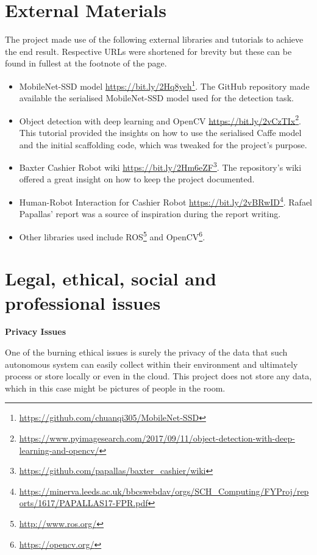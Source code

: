 \begin{appendices}
\chapter{External Materials}

The project made use of the following external libraries and tutorials to achieve the end result. Respective URLs were shortened for brevity but these can be found in fullest at the footnote of the page.

\begin{itemize}
  \item MobileNet-SSD model \url{https://bit.ly/2Hq8yeh}\footnote{\url{https://github.com/chuanqi305/MobileNet-SSD}}. The GitHub repository made available the serialised MobileNet-SSD model used for the detection task. 
  \item Object detection with deep learning and OpenCV \url{https://bit.ly/2vCzTIx}\footnote{\url{https://www.pyimagesearch.com/2017/09/11/object-detection-with-deep-learning-and-opencv/}}. This tutorial provided the insights on how to use the serialised Caffe model and the initial scaffolding code, which was tweaked for the project's purpose.
  \item Baxter Cashier Robot wiki \url{https://bit.ly/2Hm6eZF}\footnote{\url{https://github.com/papallas/baxter_cashier/wiki}}. The repository's wiki offered a great insight on how to keep the project documented.
  \item Human-Robot Interaction for Cashier Robot \url{https://bit.ly/2vBRwID}\footnote{\url{https://minerva.leeds.ac.uk/bbcswebdav/orgs/SCH_Computing/FYProj/reports/1617/PAPALLAS17-FPR.pdf}}. Rafael Papallas' report was a source of inspiration during the report writing.
  \item Other libraries used include ROS\footnote{\url{http://www.ros.org/}} and OpenCV\footnote{\url{https://opencv.org/}}.
\end{itemize}

\chapter{Legal, ethical, social and professional issues}

\textbf{Privacy Issues}

One of the burning ethical issues is surely the privacy of the data that such autonomous system can easily collect within their environment and ultimately process or store locally or even in the cloud. This project does not store any data, which in this case might be pictures of people in the room.


\end{appendices}
